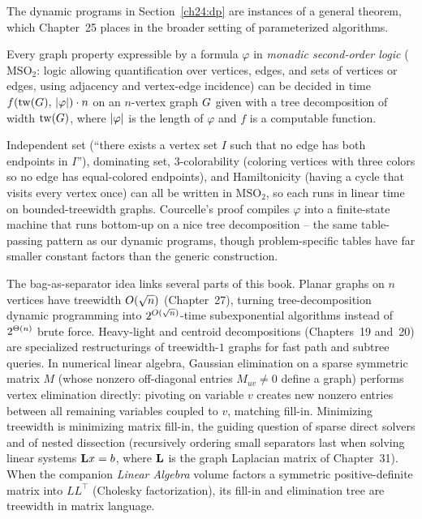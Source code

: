 The dynamic programs in Section~\ref{ch24:dp} are instances of a general theorem,
which Chapter~25 places in the broader setting of parameterized algorithms.

\begin{theorem}[Courcelle, 1990]
\label{ch24:thm-courcelle}
Every graph property expressible by a formula $\varphi$ in \emph{monadic
second-order logic} ($\mathrm{MSO}_2$: logic allowing quantification over vertices,
edges, and sets of vertices or edges, using adjacency and vertex-edge incidence)
can be decided in time $f(\operatorname{tw}(G),\,\lvert\varphi\rvert)\cdot n$ on an $n$-vertex graph
$G$ given with a tree decomposition of width $\operatorname{tw}(G)$, where $\lvert\varphi\rvert$
is the length of $\varphi$ and $f$ is a computable function.
\end{theorem}

Independent set (``there exists a vertex set $I$ such that no edge has both
endpoints in $I$''), dominating set, $3$-colorability (coloring vertices with three
colors so no edge has equal-colored endpoints), and Hamiltonicity (having a cycle
that visits every vertex once) can all be written in $\mathrm{MSO}_2$, so each runs
in linear time on bounded-treewidth graphs. Courcelle's proof compiles $\varphi$
into a finite-state machine that runs bottom-up on a nice tree decomposition -- the
same table-passing pattern as our dynamic programs, though problem-specific tables
have far smaller constant factors than the generic construction.

\begin{connectionbox}
The bag-as-separator idea links several parts of this book. Planar graphs on $n$
vertices have treewidth $O(\sqrt n)$ (Chapter~27), turning tree-decomposition
dynamic programming into $2^{O(\sqrt n)}$-time subexponential algorithms instead
of $2^{\Theta(n)}$ brute force. Heavy-light and centroid decompositions (Chapters~19
and~20) are specialized restructurings of treewidth-$1$ graphs for fast path and
subtree queries. In numerical linear algebra, Gaussian elimination on a sparse
symmetric matrix $M$ (whose nonzero off-diagonal entries $M_{uv}\ne 0$ define a
graph) performs vertex elimination directly: pivoting on variable $v$ creates new
nonzero entries between all remaining variables coupled to $v$, matching fill-in.
Minimizing treewidth is minimizing matrix fill-in, the guiding question of sparse
direct solvers and of nested dissection (recursively ordering small separators last
when solving linear systems $\mathbf{L} x=b$, where $\mathbf{L}$ is the graph Laplacian matrix
of Chapter~31). When the companion \emph{Linear Algebra} volume factors a symmetric
positive-definite matrix into $LL^\top$ (Cholesky factorization), its fill-in and
elimination tree are treewidth in matrix language.
\end{connectionbox}


